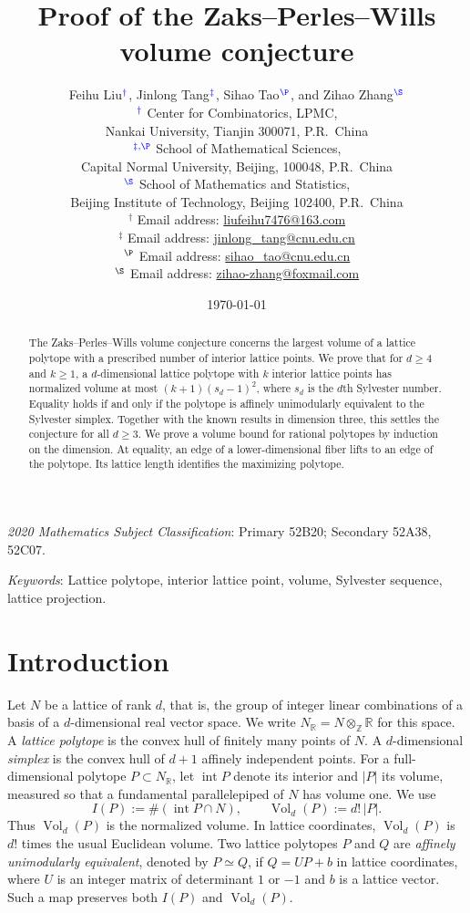 \documentclass[reqno, 11pt]{article}
\title{Proof of the Zaks--Perles--Wills volume conjecture}
\author{Feihu Liu$^{\color{blue} \dag}$, Jinlong Tang$^{\color{blue} \ddag}$, Sihao Tao$^{\color{blue} \P}$, and Zihao Zhang$^{\color{blue} \S}$
\\[2mm]
{\small $^{\color{blue} \dag}$ Center for Combinatorics, LPMC,}\\[-0.8ex]
{\small Nankai University, Tianjin 300071, P.R.~China}\\
{\small $^{\color{blue} \ddag, \P}$ School of Mathematical Sciences,}\\[-0.8ex]
{\small Capital Normal University, Beijing, 100048, P.R.~China}\\
{\small $^{\color{blue} \S}$ School of Mathematics and Statistics,}\\[-0.8ex]
{\small Beijing Institute of Technology, Beijing 102400, P.R.~China}\\
{\small {\color{blue} $^\dag$} Email address: \url{liufeihu7476@163.com}}\\
{\small {\color{blue} $^\ddag$} Email address: \url{jinlong\_tang@cnu.edu.cn}}\\
{\small {\color{blue} $^\P$} Email address: \url{sihao\_tao@cnu.edu.cn}}\\
{\small {\color{blue} $^\S$} Email address: \url{zihao-zhang@foxmail.com}}\\
}
\date{\today}
\numberwithin{equation}{section}
\theoremstyle{definition}
\newcommand{\R}{\mathbb R}
\newcommand{\Z}{\mathbb Z}
\DeclareMathOperator{\Vol}{Vol}
\DeclareMathOperator{\intr}{int}
\begin{document}
\maketitle

\begin{abstract}
The Zaks--Perles--Wills volume conjecture concerns the largest volume
of a lattice polytope with a prescribed number of interior lattice
points. We prove that for $d\ge4$ and $k\ge1$, a $d$-dimensional
lattice polytope with $k$ interior lattice points has normalized volume
at most $(k+1)(s_d-1)^2$, where $s_d$ is the $d$th Sylvester number.
Equality holds if and only if the polytope is affinely unimodularly
equivalent to the Sylvester simplex. Together with the known results
in dimension three, this settles the conjecture for all $d\ge3$.
We prove a volume bound for rational polytopes by induction on the
dimension. At equality, an edge of a lower-dimensional fiber lifts to
an edge of the polytope. Its lattice length identifies the maximizing
polytope.
\end{abstract}

\noindent
\begin{small}
\emph{2020 Mathematics Subject Classification}: Primary 52B20; Secondary 52A38, 52C07.
\end{small}

\noindent
\begin{small}
\emph{Keywords}: Lattice polytope, interior lattice point, volume, Sylvester sequence, lattice projection.
\end{small}


\section{Introduction}

Let $N$ be a lattice of rank $d$, that is, the group of integer
linear combinations of a basis of a $d$-dimensional real vector
space. We write $N_{\R}=N\otimes_{\Z}\R$ for this space.
A \emph{lattice polytope} is the convex hull of finitely many
points of $N$. A $d$-dimensional \emph{simplex} is the convex hull of
$d+1$ affinely independent points. For a full-dimensional polytope
$P\subset N_{\R}$, let $\intr P$ denote its interior and $|P|$ its
volume, measured so that a fundamental parallelepiped of $N$ has
volume one. We use
\[
 I(P):=\#(\intr P\cap N),\qquad \Vol_d(P):=d!\,|P|.
\]
Thus $\Vol_d(P)$ is the normalized volume. In lattice coordinates,
$\Vol_d(P)$ is $d!$ times the usual Euclidean volume. Two lattice polytopes
$P$ and $Q$ are \emph{affinely unimodularly equivalent}, denoted by
$P\simeq Q$, if $Q=UP+b$ in lattice coordinates, where
$U$ is an integer matrix of determinant $1$ or $-1$ and $b$ is a lattice vector.
Such a map preserves both $I(P)$ and $\Vol_d(P)$.
\end{document}
